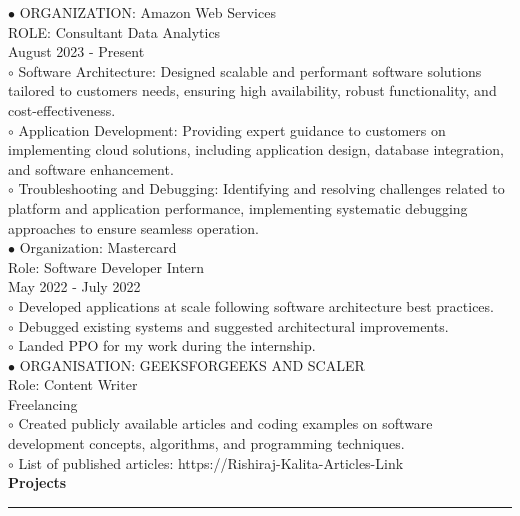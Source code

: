 \documentclass[11pt,a4paper]{article}
\renewcommand{\section}[1]{%
  \vspace{12pt}%
  {\large\bfseries #1}%
  \vspace{6pt}%
  \hrule%
  \vspace{6pt}%
}
\begin{document}
\noindent $\bullet$ ORGANIZATION: Amazon Web Services\\[0.2cm]
ROLE: Consultant Data Analytics\\[0.2cm]
August 2023 - Present\\[0.2cm]
\hspace{0.5cm}$\circ$ Software Architecture: Designed scalable and performant software solutions tailored to customers needs, ensuring high availability, robust functionality, and cost-effectiveness.\\[0.1cm]
\hspace{0.5cm}$\circ$ Application Development: Providing expert guidance to customers on implementing cloud solutions, including application design, database integration, and software enhancement.\\[0.1cm]
\hspace{0.5cm}$\circ$ Troubleshooting and Debugging: Identifying and resolving challenges related to platform and application performance, implementing systematic debugging approaches to ensure seamless operation.\\[0.1cm]
\noindent $\bullet$ Organization: Mastercard\\[0.2cm]
Role: Software Developer Intern\\[0.2cm]
May 2022 - July 2022\\[0.2cm]
\hspace{0.5cm}$\circ$ Developed applications at scale following software architecture best practices.\\[0.1cm]
\hspace{0.5cm}$\circ$ Debugged existing systems and suggested architectural improvements.\\[0.1cm]
\hspace{0.5cm}$\circ$ Landed PPO for my work during the internship.\\[0.1cm]
\noindent $\bullet$ ORGANISATION: GEEKSFORGEEKS AND SCALER\\[0.2cm]
Role: Content Writer\\[0.2cm]
Freelancing\\[0.2cm]
\hspace{0.5cm}$\circ$ Created publicly available articles and coding examples on software development concepts, algorithms, and programming techniques.\\[0.1cm]
\hspace{0.5cm}$\circ$ List of published articles: https://Rishiraj-Kalita-Articles-Link\\[0.1cm]
\section{Projects}
\end{document}
